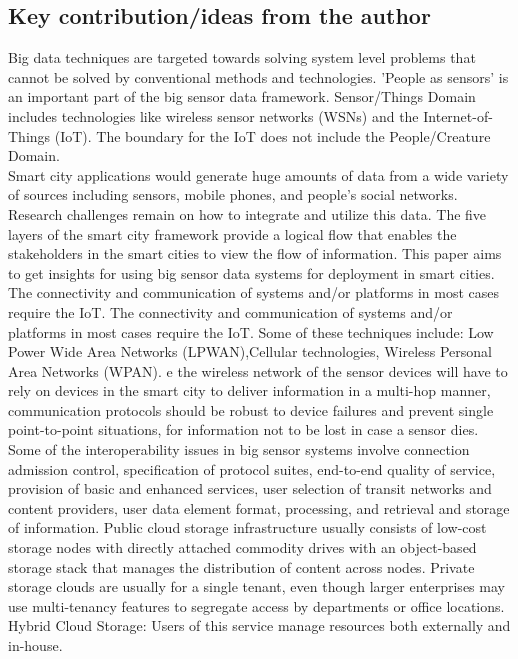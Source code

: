 \documentclass{report}
\begin{document}
\begin{multicols}{1}    
    \section*{Key contribution/ideas from the author}
   
    Big data techniques are targeted towards solving system level problems that cannot be solved by conventional methods and technologies. 'People as sensors' is an important part of the big sensor data framework. Sensor/Things Domain includes technologies like wireless sensor networks (WSNs) and the Internet-of-Things (IoT). The boundary for the IoT does not include the People/Creature Domain.\\
Smart city applications would generate huge amounts of data from a wide variety of sources including sensors, mobile phones, and people’s social networks. Research challenges remain on how to integrate and utilize this data. The five layers of the smart city framework provide a logical flow that enables the stakeholders in the smart cities to view the flow of information. This paper aims to get insights for using big sensor data systems for deployment in smart cities.\\
The connectivity and communication of systems and/or platforms in most cases require the IoT. The connectivity and communication of systems and/or platforms in most cases require the IoT. Some of these techniques include: Low Power Wide Area Networks (LPWAN),Cellular technologies, Wireless Personal Area Networks (WPAN). e the wireless network of the sensor devices will have to rely on devices in the smart city to deliver information in a multi-hop manner, communication protocols should be robust to device failures and prevent single point-to-point situations, for information not to be lost in case a sensor dies.\\
Some of the interoperability issues in big sensor systems involve connection admission control, specification of protocol suites, end-to-end quality of service, provision of basic and enhanced services, user selection of transit networks and content providers, user data element format, processing, and retrieval and storage of information. Public cloud storage infrastructure usually consists of low-cost storage nodes with directly attached commodity drives with an object-based storage stack that manages the distribution of content across nodes. Private storage clouds are usually for a single tenant, even though larger enterprises may use multi-tenancy features to segregate access by departments or office locations. Hybrid Cloud Storage: Users of this service manage resources both externally and in-house.\\

\end{multicols}
\end{document}
